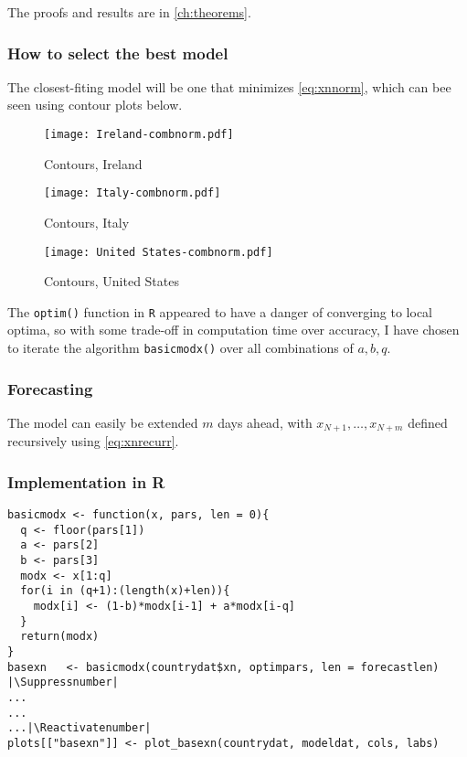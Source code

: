 The proofs and results are in \ref{ch:theorems}.

\subsubsection{How to select the best model}

The closest-fiting model will be one that minimizes \eqref{eq:xnnorm}, which can bee seen using contour plots below.

\begin{figure}[H]
  \texttt{[image: Ireland-combnorm.pdf]} \label{fig:ireland-combnorm}
\caption{Contours, Ireland}
\endminipage\hfill
{}
  \texttt{[image: Italy-combnorm.pdf]} \label{fig:italy-combnorm}
\caption{Contours, Italy}
\endminipage\hfill
{}
  \texttt{[image: United States-combnorm.pdf]} \label{fig:usa-combnorm}
\caption{Contours, United States}
\endminipage\hfill
\end{figure}

The \verb|optim()| function in \verb|R| appeared to have a danger of converging to local optima, so with some trade-off in computation time over accuracy, I have chosen to iterate the algorithm \verb|basicmodx()| over all combinations of $a,b,q$.

\subsubsection{Forecasting}

The model can easily be extended $m$ days ahead, with $x_{N+1},\dots,x_{N+m}$ defined recursively using \ref{eq:xnrecurr}.

\subsubsection{Implementation in R}

\begin{lstlisting}[breaklines = true, escapeinside=||, tabsize = 4, caption = {Algorithm for Base Model}]
basicmodx <- function(x, pars, len = 0){
  q <- floor(pars[1])
  a <- pars[2]
  b <- pars[3]
  modx <- x[1:q]
  for(i in (q+1):(length(x)+len)){
    modx[i] <- (1-b)*modx[i-1] + a*modx[i-q]
  }
  return(modx)
}
basexn   <- basicmodx(countrydat$xn, optimpars, len = forecastlen)  |\Suppressnumber|
...
...
...|\Reactivatenumber|
plots[["basexn"]] <- plot_basexn(countrydat, modeldat, cols, labs)
\end{lstlisting}


